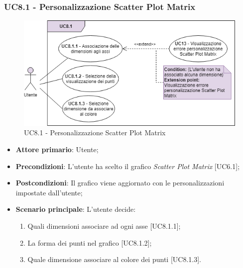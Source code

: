 \subsubsection{UC8.1 - Personalizzazione Scatter Plot Matrix}
\begin{figure}[h]
\includegraphics[width=\linewidth]{Section/Images/UC8.1.png}
\centering
\caption{UC8.1 - Personalizzazione Scatter Plot Matrix}
\end{figure}
\begin{itemize}
	\item \textbf{Attore primario}: Utente;
	
	\item \textbf{Precondizioni}: L'utente ha scelto il grafico \textit{Scatter Plot Matrix} [UC6.1];
	
	\item \textbf{Postcondizioni}: Il grafico viene aggiornato con le personalizzazioni impostate dall'utente;
	
	\item \textbf{Scenario principale}: L'utente decide:

\begin{enumerate}
\item Quali dimensioni associare ad ogni asse [UC8.1.1];
\item La forma dei punti nel grafico [UC8.1.2];
\item Quale dimensione associare al colore dei punti [UC8.1.3].
\end{enumerate}	
	
		
\end{itemize}


